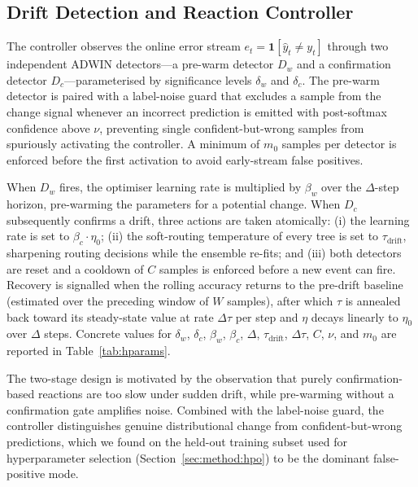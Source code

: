 \documentclass[sigconf,anonymous,review]{acmart}
\begin{document}
\subsection{Drift Detection and Reaction Controller}
\label{sec:method:drift}
The controller observes the online error stream $e_t = \mathbf{1}[\hat{y}_t \neq y_t]$ through two independent ADWIN detectors—a pre-warm detector $D_w$ and a
confirmation detector $D_c$—parameterised by significance levels $\delta_w$ and $\delta_c$. The pre-warm detector is paired with a label-noise guard that excludes a
sample from the change signal whenever an incorrect prediction is emitted with post-softmax confidence above $\nu$, preventing single confident-but-wrong samples from
spuriously activating the controller. A minimum of $m_0$ samples per detector is enforced before the first activation to avoid early-stream false positives.

When $D_w$ fires, the optimiser learning rate is multiplied by $\beta_w$ over the $\Delta$-step horizon, pre-warming the parameters for a potential change. When $D_c$
subsequently confirms a drift, three actions are taken atomically: (i) the learning rate is set to $\beta_c \cdot \eta_0$; (ii) the soft-routing temperature of every tree
is set to $\tau_{\mathrm{drift}}$, sharpening routing decisions while the ensemble re-fits; and (iii) both detectors are reset and a cooldown of $C$ samples is enforced
before a new event can fire. Recovery is signalled when the rolling accuracy returns to the pre-drift baseline (estimated over the preceding window of $W$ samples),
after which $\tau$ is annealed back toward its steady-state value at rate $\Delta\tau$ per step and $\eta$ decays linearly to $\eta_0$ over $\Delta$ steps. Concrete values
for $\delta_w$, $\delta_c$, $\beta_w$, $\beta_c$, $\Delta$, $\tau_{\mathrm{drift}}$, $\Delta\tau$, $C$, $\nu$, and $m_0$ are reported in Table~\ref{tab:hparams}.

The two-stage design is motivated by the observation that purely confirmation-based reactions are too slow under sudden drift, while
pre-warming without a confirmation gate amplifies noise. Combined with the label-noise guard, the controller distinguishes genuine
distributional change from confident-but-wrong predictions, which we found on the held-out training subset used for hyperparameter
selection (Section~\ref{sec:method:hpo}) to be the dominant false-positive mode.
\end{document}
